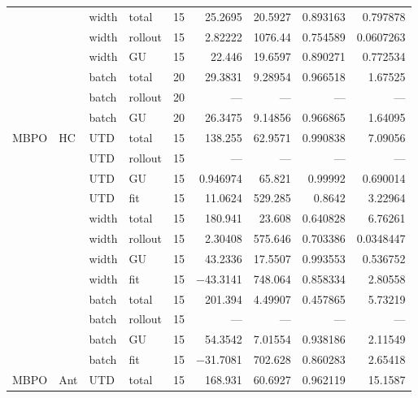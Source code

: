 {\begin{longtable}{@{}llllrrrrr@{}}
     &  & width & total & \num{15} & \num{25.2695} & \num{20.5927} & \num{0.893163} & \num{0.797878} \\
     &  & width & rollout & \num{15} & \num{2.82222} & \num{1076.44} & \num{0.754589} & \num{0.0607263} \\
     &  & width & GU & \num{15} & \num{22.446} & \num{19.6597} & \num{0.890271} & \num{0.772534} \\
     &  & batch & total & \num{20} & \num{29.3831} & \num{9.28954} & \num{0.966518} & \num{1.67525} \\
     &  & batch & rollout & \num{20} & --- & --- & --- & --- \\
     &  & batch & GU & \num{20} & \num{26.3475} & \num{9.14856} & \num{0.966865} & \num{1.64095} \\
    \midrule
    MBPO & HC & UTD & total & \num{15} & \num{138.255} & \num{62.9571} & \num{0.990838} & \num{7.09056} \\
     &  & UTD & rollout & \num{15} & --- & --- & --- & --- \\
     &  & UTD & GU & \num{15} & \num{0.946974} & \num{65.821} & \num{0.99992} & \num{0.690014} \\
     &  & UTD & fit & \num{15} & \num{11.0624} & \num{529.285} & \num{0.8642} & \num{3.22964} \\
     &  & width & total & \num{15} & \num{180.941} & \num{23.608} & \num{0.640828} & \num{6.76261} \\
     &  & width & rollout & \num{15} & \num{2.30408} & \num{575.646} & \num{0.703386} & \num{0.0348447} \\
     &  & width & GU & \num{15} & \num{43.2336} & \num{17.5507} & \num{0.993553} & \num{0.536752} \\
     &  & width & fit & \num{15} & \num{-43.3141} & \num{748.064} & \num{0.858334} & \num{2.80558} \\
     &  & batch & total & \num{15} & \num{201.394} & \num{4.49907} & \num{0.457865} & \num{5.73219} \\
     &  & batch & rollout & \num{15} & --- & --- & --- & --- \\
     &  & batch & GU & \num{15} & \num{54.3542} & \num{7.01554} & \num{0.938186} & \num{2.11549} \\
     &  & batch & fit & \num{15} & \num{-31.7081} & \num{702.628} & \num{0.860283} & \num{2.65418} \\
    MBPO & Ant & UTD & total & \num{15} & \num{168.931} & \num{60.6927} & \num{0.962119} & \num{15.1587} \\

\end{longtable}}

